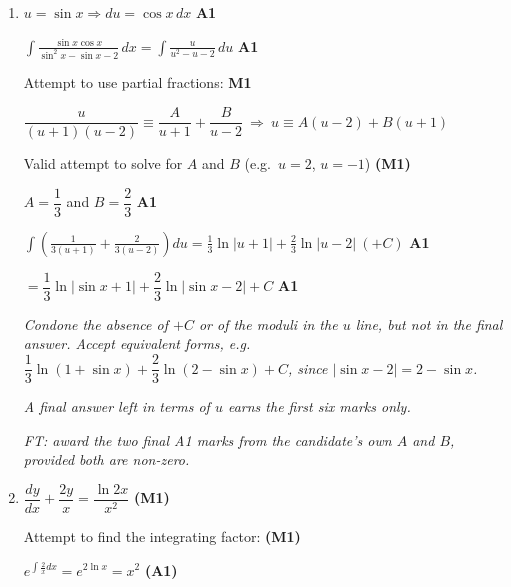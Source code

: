 \documentclass[12pt, twoside]{article}
\begin{document}
\begin{enumerate}[itemsep=0.3cm]
\newpage

\item[3.] 

$u = \sin x \Rightarrow du = \cos x\, dx$ \hfill \textbf{A1}

$\displaystyle\int \frac{\sin x \cos x}{\sin^{2} x - \sin x - 2}\, dx
= \int \frac{u}{u^{2} - u - 2}\, du$ \hfill \textbf{A1}

Attempt to use partial fractions: \hfill \textbf{M1}

$\dfrac{u}{(u + 1)(u - 2)} \equiv \dfrac{A}{u + 1} + \dfrac{B}{u - 2}
\ \Rightarrow\ u \equiv A(u - 2) + B(u + 1)$

Valid attempt to solve for $A$ and $B$ (e.g.\ $u = 2$, $u = -1$)
\hfill \textbf{(M1)}

$A = \dfrac{1}{3}$ and $B = \dfrac{2}{3}$ \hfill \textbf{A1}

$\displaystyle\int\left(\frac{1}{3(u + 1)} + \frac{2}{3(u - 2)}\right) du
= \frac{1}{3}\ln|u + 1| + \frac{2}{3}\ln|u - 2| \ (+C)$ \hfill \textbf{A1}

$= \dfrac{1}{3}\ln|\sin x + 1| + \dfrac{2}{3}\ln|\sin x - 2| + C$
\hfill \textbf{A1}

\emph{Condone the absence of $+C$ or of the moduli in the $u$ line, but not in
the final answer. Accept equivalent forms, e.g.\
$\dfrac{1}{3}\ln(1 + \sin x) + \dfrac{2}{3}\ln(2 - \sin x) + C$, since
$|\sin x - 2| = 2 - \sin x$.}

\emph{A final answer left in terms of $u$ earns the first six marks only.}

\emph{FT: award the two final A1 marks from the candidate's own $A$ and $B$,
provided both are non-zero.}

\newpage

\item[4.] 

$\dfrac{dy}{dx} + \dfrac{2y}{x} = \dfrac{\ln 2x}{x^{2}}$ \hfill \textbf{(M1)}

Attempt to find the integrating factor: \hfill \textbf{(M1)}

$e^{\int \frac{2}{x} dx} = e^{2\ln x} = x^{2}$ \hfill \textbf{(A1)}


\end{enumerate}
\end{document}
